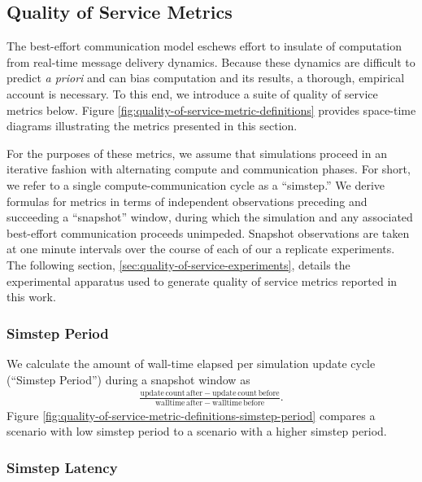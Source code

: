 \subsection{Quality of Service Metrics} \label{sec:quality-of-service-metrics}



The best-effort communication model eschews effort to insulate of computation from real-time message delivery dynamics.
Because these dynamics are difficult to predict \textit{a priori} and can bias computation and its results, a thorough, empirical account is necessary.
To this end, we introduce a suite of quality of service metrics below.
Figure \ref{fig:quality-of-service-metric-definitions} provides space-time diagrams illustrating the metrics presented in this section.

For the purposes of these metrics, we assume that simulations proceed in an iterative fashion with alternating compute and communication phases.
For short, we refer to a single compute-communication cycle as a ``simstep.''
We derive formulas for metrics in terms of independent observations preceding and succeeding a ``snapshot'' window, during which the simulation and any associated best-effort communication proceeds unimpeded.
Snapshot observations are taken at one minute intervals over the course of each of our a replicate experiments.
The following section, \ref{sec:quality-of-service-experiments}, details the experimental apparatus used to generate quality of service metrics reported in this work.

\subsubsection{Simstep Period} \label{sec:simstep-period-metric}

We calculate the amount of wall-time elapsed per simulation update cycle (``Simstep Period'') during a snapshot window as
\begin{align*}
\frac{
  \mathrm{update\,count\,after} - \mathrm{update\,count\,before}
}{
  \mathrm{walltime\,after} - \mathrm{walltime\,before}
}.
\end{align*}
Figure \ref{fig:quality-of-service-metric-definitions-simstep-period} compares a scenario with low simstep period to a scenario with a higher simstep period.

\subsubsection{Simstep Latency} \label{sec:wall-time-latency-metric}

